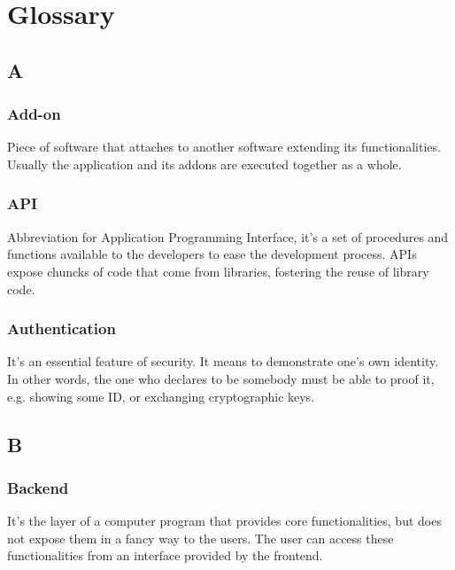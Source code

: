 \section{Glossary}

\subsection*{A}

\subsubsection*{Add-on}
Piece of software that attaches to another software extending its functionalities. Usually the application and its addons are executed together as a whole.

\subsubsection*{API}
Abbreviation for Application Programming Interface, it's a set of procedures and functions available to the developers to ease the development process. APIs expose chuncks of code that come from libraries, fostering the reuse of library code.

\subsubsection*{Authentication}
It's an essential feature of security. It means to demonstrate one's own identity. In other words, the one who declares to be somebody must be able to proof it, e.g. showing some ID, or exchanging cryptographic keys.


\subsection*{B}

\subsubsection*{Backend}
It's the layer of a computer program that provides core functionalities, but does not expose them in a fancy way to the users.
The user can access these functionalities from an interface provided by the frontend\glosp.

